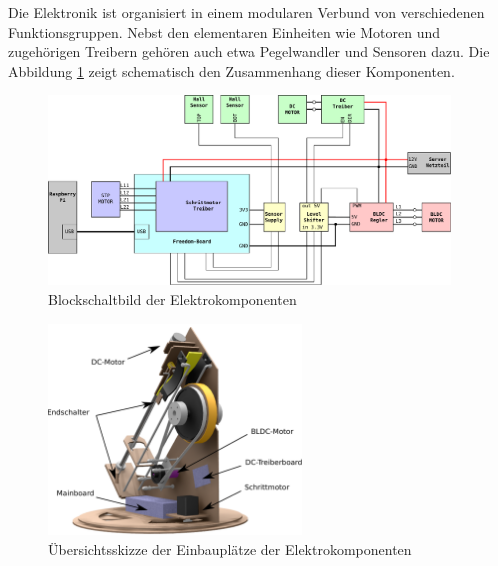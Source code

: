 
Die Elektronik ist organisiert in einem modularen Verbund von verschiedenen
Funktionsgruppen. Nebst den elementaren Einheiten wie Motoren und zugehörigen
Treibern gehören auch etwa Pegelwandler und Sensoren dazu. Die Abbildung
\ref{fig:et-block} zeigt schematisch den Zusammenhang dieser Komponenten.


\begin{figure}[h!]
	\centering
	\includegraphics[width=0.95\textwidth]{../../fig/blockdiagram.pdf}
	\caption{Blockschaltbild der Elektrokomponenten}
	\label{fig:et-block}
\end{figure}

\begin{figure}[h!]
	\centering
	\includegraphics[width=0.6\textwidth]{../../fig/et/overview.pdf}
	\caption{Übersichtsskizze der Einbauplätze der Elektrokomponenten}
\end{figure}
